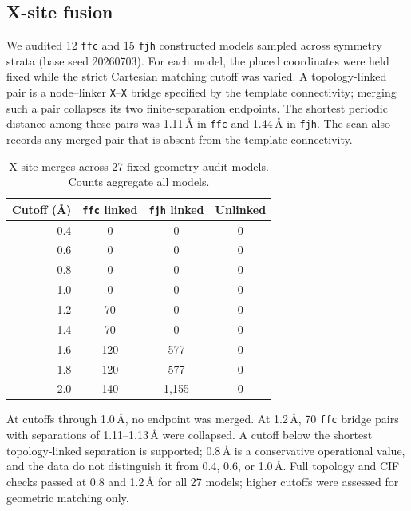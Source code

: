\documentclass[a5paper, 10pt]{article}
\begin{document}
\subsection{X-site fusion}
\label{app:x_fusion}

We audited 12 \texttt{ffc} and 15 \texttt{fjh} constructed models sampled across symmetry strata (base seed 20260703). For each model, the placed coordinates were held fixed while the strict Cartesian matching cutoff was varied. A topology-linked pair is a node--linker \texttt{X}--\texttt{X} bridge specified by the template connectivity; merging such a pair collapses its two finite-separation endpoints. The shortest periodic distance among these pairs was 1.11\,\AA{} in \texttt{ffc} and 1.44\,\AA{} in \texttt{fjh}. The scan also records any merged pair that is absent from the template connectivity.

\begin{table}[ht]
\centering
\scriptsize
\setlength{\tabcolsep}{3pt}
\caption{X-site merges across 27 fixed-geometry audit models. Counts aggregate all models.}
\label{tab:x-fusion-sensitivity}
\begin{tabular}{rccc}
\hline
Cutoff (\AA) & \texttt{ffc} linked & \texttt{fjh} linked & Unlinked \\
\hline
0.4 & 0 & 0 & 0 \\
0.6 & 0 & 0 & 0 \\
0.8 & 0 & 0 & 0 \\
1.0 & 0 & 0 & 0 \\
1.2 & 70 & 0 & 0 \\
1.4 & 70 & 0 & 0 \\
1.6 & 120 & 577 & 0 \\
1.8 & 120 & 577 & 0 \\
2.0 & 140 & 1,155 & 0 \\
\hline
\end{tabular}
\end{table}

At cutoffs through 1.0\,\AA{}, no endpoint was merged. At 1.2\,\AA{}, 70 \texttt{ffc} bridge pairs with separations of 1.11--1.13\,\AA{} were collapsed. A cutoff below the shortest topology-linked separation is supported; 0.8\,\AA{} is a conservative operational value, and the data do not distinguish it from 0.4, 0.6, or 1.0\,\AA{}. Full topology and CIF checks passed at 0.8 and 1.2\,\AA{} for all 27 models; higher cutoffs were assessed for geometric matching only.
\end{document}
